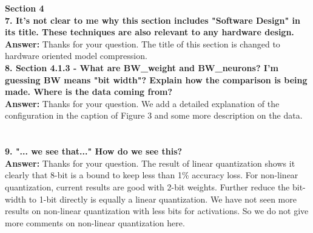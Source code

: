 \documentclass[12pt]{paper}
\newcommand{\rev}[1]{{{\color[rgb]{0,0,1}{#1}}}}
\newcommand{\answer}[1]{\noindent\textbf{Answer:} #1}
\newcommand{\comment}[1]{\noindent\textbf{#1}\\}
\begin{document}
{\noindent\textbf{Section 4}}\\

\comment{7. It's not clear to me why this section includes "Software Design" in its title. These techniques are also relevant to any hardware design.}

\answer{Thanks for your question. The title of this section is changed to hardware oriented model compression.}\\

\comment{8. Section 4.1.3 - What are BW\_weight and BW\_neurons? I'm guessing BW means "bit width"? Explain how the comparison is being made. Where is the data coming from?}

\answer{Thanks for your question. We add a detailed explanation of the configuration in the caption of Figure 3 and some more description on the data.\\

\rev{Fig. 3.  Comparison between different quantization methods from [11,14,23,40,65,66]. The quantizationconfiguration is expressed as (weight bit-width)×(activation bit-width). The "(FT)" denotes that the networkis fine-tuned after a linear quantization.}\\

\rev{We compare some typical quantization methods from [11,14,23,40,65,66] in Figure 3. All the quantization results are tested on ImageNet data set and the absolute accuracy loss compared with corresponding baseline floating point models is recorded.}}\\

\comment{9. "... we see that..." How do we see this?}

\answer{Thanks for your question. The result of linear quantization shows it clearly that 8-bit is a bound to keep less than 1\% accuracy loss. For non-linear quantization, current results are good with 2-bit weights. Further reduce the bit-width to 1-bit directly is equally a linear quantization. We have not seen more results on non-linear quantization with less bits for activations. So we do not give more comments on non-linear quantization here.\\

\rev{For linear quantization, 8-bit is a clear bound to ensure negligible accuracy loss. With 6 or less bits, using fine-tune or even training each weight from the beginning, will cause obvious accuracy degradation. If we require that $1\%$ accuracy loss is within the acceptable range, linear quantization with at least $8\times 8$ configuration and the listed non-linear quantization are available. We will further discuss the performance gain of quantization in section 5.}}\\
\end{document}
